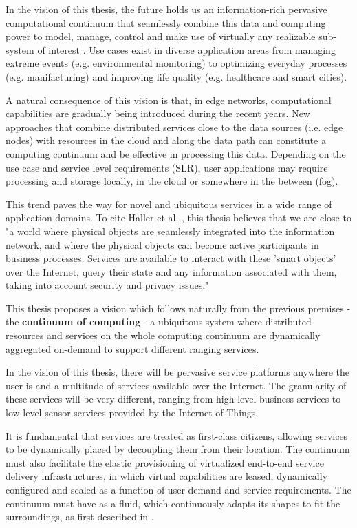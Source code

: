 \documentclass{ieeeaccess}
\begin{document}
In the vision of this thesis, the future holds us an information-rich pervasive computational continuum that seamlessly combine this data and computing power to model, manage, control and make use of virtually any realizable sub-system of interest \cite{computing-in-continuum}. Use cases exist in diverse application areas from managing extreme events (e.g. environmental monitoring) to optimizing everyday processes (e.g. manifacturing) and improving life quality (e.g. healthcare and smart cities).

A natural consequence of this vision is that, in edge networks, computational capabilities are gradually being introduced during the recent years. New approaches that combine distributed services close to the data sources (i.e. edge nodes) with resources in the cloud and along the data path can constitute a computing continuum and be effective in processing this data. Depending on the use case and service level requirements (SLR), user applications may require processing and storage locally, in the cloud or somewhere in the between (fog).

This trend paves the way for novel and ubiquitous services in a wide range of application domains. To cite Haller et al. \cite{iot-enterprise}, this thesis believes that we are close to "a world where physical objects are seamlessly integrated into the information network, and where the physical objects can become active participants in business processes. Services are available to interact with these 'smart objects' over the Internet, query their state and any information associated with them, taking into account security and privacy issues."

This thesis proposes a vision which follows naturally from the previous premises - the \textbf{continuum of computing} - a  ubiquitous system where distributed resources and services on the whole computing continuum are dynamically aggregated on-demand to support different ranging services.

In the vision of this thesis, there will be pervasive service platforms anywhere the user is and a multitude of services available over the Internet. The granularity of these services will be very different, ranging from high-level business services to low-level sensor services provided by the Internet of Things.

It is fundamental that services are treated as first-class citizens, allowing services to be dynamically placed by decoupling them from their location. The continuum must also facilitate the elastic provisioning of virtualized end-to-end service delivery infrastructures, in which virtual capabilities are leased, dynamically configured and scaled as a function of user demand and service requirements. The continuum must have as a fluid, which continuously adapts its shapes to fit the surroundings, as first described in \cite{fluid-internet}.
\end{document}
